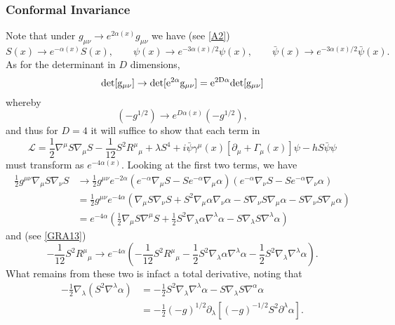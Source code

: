 \documentclass[10pt,letterpaper]{article}
\numberwithin{equation}{subsection}
\begin{document}
\subsubsection{Conformal Invariance}
Note that under $g_{\mu\nu}\to e^{2\alpha(x)}g_{\mu\nu}$ we have (see \ref{A2})
\begin{equation}
S(x) \to e^{-\alpha(x)}S(x),\qquad \psi(x)\to e^{-3\alpha(x)/2}\psi(x),\qquad \bar \psi(x)\to e^{-3\alpha(x)/2}\bar\psi(x).
\end{equation}
As for the determinant in $D$ dimensions,
\begin{equation}
	\rm{det}[g_{\mu\nu}]\to \rm{det}[e^{2\alpha}g_{\mu\nu}] = e^{2D\alpha}det[g_{\mu\nu}]
\end{equation}
whereby
\begin{equation}
	(-g^{1/2}) \to e^{D\alpha(x)}(-g^{1/2}),
\end{equation}
and thus for $D=4$ it will suffice to show that each term in 
\begin{equation}
\mathcal L =  \frac12 \nabla^\mu S \nabla_\mu S - \frac{1}{12} S^2 R^{\mu}{}_{\mu} + \lambda S^4 
+ i\bar\psi\gamma^\mu(x)[\partial_\mu + \Gamma_\mu(x)]\psi -hS\bar\psi\psi
\end{equation}
must transform as $e^{-4\alpha(x)}$. Looking at the first two terms, we have
\begin{align}
\frac12 g^{\mu\nu}\nabla_\mu S\nabla_\nu S &\to   \frac12 g^{\mu\nu}e^{-2\alpha} \left( e^{-\alpha} \nabla_\mu S - S e^{-\alpha}\nabla_\mu \alpha \right)\left( e^{-\alpha} \nabla_\nu S - S e^{-\alpha}\nabla_\nu \alpha \right)\\
&=  \frac12 g^{\mu\nu}e^{-4\alpha} \left( \nabla_\mu S\nabla_\nu S + S^2 \nabla_\mu\alpha\nabla_\nu\alpha -S \nabla_\nu S \nabla_\mu \alpha - S\nabla_\nu S\nabla_\mu \alpha \right)
\nonumber\\
&= e^{-4\alpha}\left( \frac{1}{2} \nabla_\mu S\nabla^\mu S + \frac{1}{2} S^2 \nabla_\lambda \alpha \nabla^\lambda\alpha - S \nabla_\lambda S\nabla^\lambda \alpha \right) 
\end{align}
and (see \ref{GRA13})
\begin{equation}
-\frac{1}{12} S^2 R^\mu{}_\mu \to e^{-4\alpha}\left(-\frac{1}{12} S^2 R^\mu{}_\mu -\frac12 S^2 \nabla_\lambda\alpha \nabla^\lambda \alpha -\frac12 S^2 \nabla_\lambda
\nabla^\lambda \alpha \right).
\end{equation}
What remains from these two is infact a total derivative, noting that
\begin{align}
-\frac12 \nabla_\lambda ( S^2 \nabla^\lambda \alpha ) &= -\frac12 S^2 \nabla_\lambda \nabla^\lambda \alpha - S\nabla_\lambda S\nabla^\alpha \alpha
\nonumber\\
&= -\frac{1}{2}(-g)^{1/2} \partial_\lambda \left[ (-g)^{-1/2}S^2\partial^\lambda \alpha \right].
\end{align}
\end{document}
